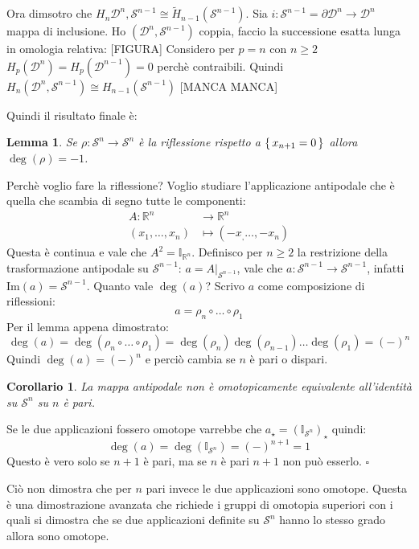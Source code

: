 \documentclass[10pt, twoside=false, x11names]{scrbook}
\newtheorem{lemma}[theorem]{Lemma}
\newtheorem{corollary}[theorem]{Corollario}
\newenvironment{proof}{{\textbf{Dimostrazione}:}}{\hfill $\square$}
\newcommand{\im}[1]{\mathrm{Im}( #1 )}
\newcommand{\RN}[1][]{\mathbb{R}^#1}
\newcommand{\Id}[1][]{\mathbb{I}_#1}
\newcommand{\Sph}[1][]{\mathcal{S}^#1}
\newcommand{\Disk}[1][]{\mathcal{D}^#1}
\begin{document}
Ora dimsotro che $ H_n{\Disk{n}, \Sph{n-1}} \cong \tilde{H}_{n-1}(\Sph{n-1}) $.
Sia $ i \colon \Sph{n-1} = \partial \Disk{n} \to \Disk{n} $ mappa di inclusione. Ho $ (\Disk{n}, \Sph{n-1}) $ coppia,
faccio la successione esatta lunga in omologia relativa:
[FIGURA]
Considero per $ p = n $ con $ n \geq 2 $ $ H_p(\Disk{n}) = H_p(\Disk{n-1}) = 0 $ perchè contraibili.
Quindi $ H_n(\Disk{n}, \Sph{n-1}) \cong H_{n-1}(\Sph{n-1}) $
[MANCA MANCA]


Quindi il risultato finale è:
\begin{lemma}
  Se $ \rho \colon \Sph{n} \to \Sph{n} $ è la riflessione rispetto a $ \set{x_{n+1} = 0} $ allora
  $ \deg{(\rho)} = - 1 $.
\end{lemma}

Perchè voglio fare la riflessione?
Voglio studiare l'applicazione antipodale che è quella che scambia di segno tutte le componenti:
\begin{align*}
  A \colon \RN{n} & \to \RN{n} \\
  (x_1, \dots, x_{n}) & \mapsto (-x_, \dots, -x_n)
\end{align*}
Questa è continua e vale che $ A^2 = \Id{\RN{n}}$. Definisco per $ n \geq 2 $ la restrizione della trasformazione
antipodale su $ \Sph{n-1} $: $ a = A \lvert_{\Sph{n-1}} $, vale che $ a \colon \Sph{n-1} \to \Sph{n-1} $, infatti
$ \im{a} = \Sph{n-1} $. Quanto vale $ \deg{(a)} $?
Scrivo $ a $ come composizione di riflessioni:
\[
  a = \rho_n \circ \dots \circ \rho_1
\]
Per il lemma appena dimostrato:
\[
  \deg{(a)} = \deg{(\rho_n \circ \dots \circ \rho_1)} = \deg{(\rho_n)}\deg{(\rho_{n-1})}\dots\deg{(\rho_1)} = (-)^n
\]
Quindi $ \deg{(a)} = (-)^n $ e perciò cambia se $ n $ è pari o dispari.

\begin{corollary}
  La mappa antipodale non è omotopicamente equivalente all'identità su $ \Sph{n} $ su $ n $ è pari.
\end{corollary}
\begin{proof}
  Se le due applicazioni fossero omotope varrebbe che $ a_\star = (\Id{\Sph{n}})_\star $ quindi:
  \[
    \deg{(a)} = \deg{(\Id{\Sph{n}})} = (-)^{n+1} = 1
  \]
  Questo è vero solo se $ n + 1 $ è pari, ma se $ n $ è pari $ n + 1 $ non può esserlo.
\end{proof}

Ciò non dimostra che per $ n $ pari invece le due applicazioni sono omotope. Questa è una
dimostrazione avanzata che richiede i gruppi di omotopia superiori con i quali si dimostra
che se due applicazioni definite su $ \Sph{n} $ hanno lo stesso grado allora sono omotope.
\end{document}
